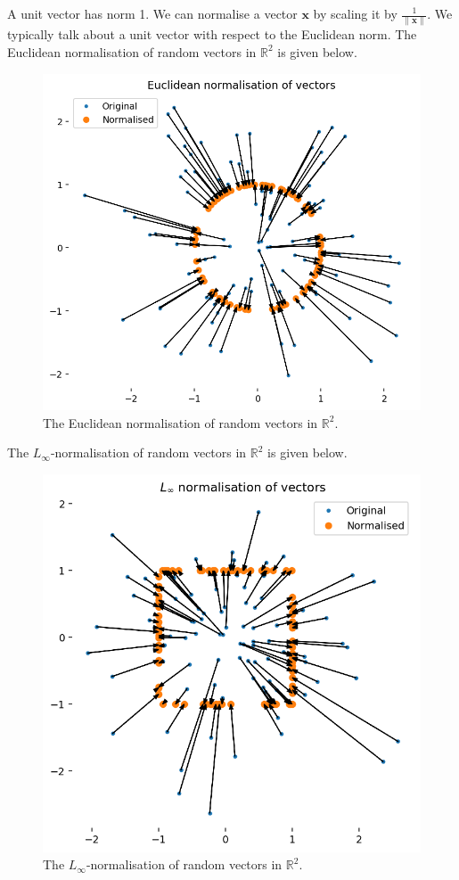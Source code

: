 \documentclass[a4paper, openany]{memoir}
\begin{document}
    A unit vector has norm 1. We can normalise a vector $\mathbf{x}$ by scaling it by $\frac{1}{\lVert \mathbf{x} \rVert}$. We typically talk about a unit vector with respect to the Euclidean norm. The Euclidean normalisation of random vectors in $\mathbb{R}^2$ is given below.
    \begin{figure}[H]
        \centering
        \includegraphics[scale=0.5]{src/3.2 Euclidean Normalisation.png}
        \caption{The Euclidean normalisation of random vectors in $\mathbb{R}^2$.}
    \end{figure}
    \noindent The $L_\infty$-normalisation of random vectors in $\mathbb{R}^2$ is given below.
    \begin{figure}[H]
        \centering
        \includegraphics[scale=0.5]{src/3.3 Linfty Normalisation.png}
        \caption{The $L_\infty$-normalisation of random vectors in $\mathbb{R}^2$.}
    \end{figure}
    
\end{document}
